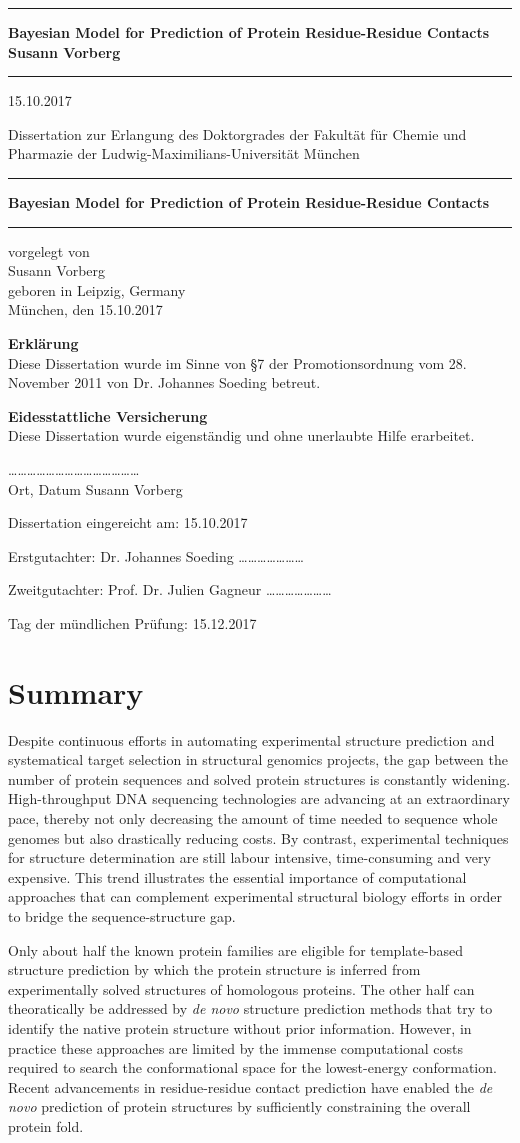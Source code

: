 \documentclass[11pt,a4paper,twoside]{book}
\newcommand{\LMUCover}[3]{
    \thispagestyle{empty}
    {\parindent0cm \rule{\linewidth}{.7ex}}
    
    \begin{flushright}
      \vspace*{\stretch{1}}
      \sffamily\bfseries\Huge
      #1\\
      \vspace*{\stretch{1}}
      \sffamily\bfseries\large
      #2
      \vspace*{\stretch{1}}
    \end{flushright}
  
    \rule{\linewidth}{.7ex}
    \vspace*{\stretch{5}}
    \vspace*{\stretch{1}}
    
    \begin{center}\sffamily\LARGE{#3}\end{center}
}
\newcommand{\LMUTitlePage}[4]{
    \thispagestyle{empty}
    \vspace*{\stretch{1}}
    
    \begin{center}
      \Large Dissertation zur Erlangung des Doktorgrades der Fakultät für Chemie und Pharmazie der Ludwig-Maximilians-Universität München
    \end{center}
    
    \vspace*{\stretch{1}}
    {\parindent0cm \rule{\linewidth}{.7ex}}
    
    \begin{flushright}
      \vspace*{\stretch{1}}
      \sffamily\bfseries\Huge
      #1\\
      \vspace*{\stretch{1}}
    \end{flushright}
  
    \rule{\linewidth}{.7ex}

    \vspace*{\stretch{3}}
    \begin{center}
      \Large vorgelegt von\\
      \Large #2\\
      \Large geboren in #3\\
      \vspace*{\stretch{2}}
      \Large München, den #4
    \end{center}
}
\newcommand{\LMUErklaerung}[5]{
    \thispagestyle{empty}
    \begin{flushleft}
      \large \textbf{Erklärung} \\[1mm]
      \large Diese Dissertation wurde im Sinne von §7 der Promotionsordnung vom 28. November 2011 von #2 betreut.
      \bigskip
  
      \large \textbf{Eidesstattliche Versicherung}\\[1mm]
      \large Diese Dissertation wurde eigenständig und ohne unerlaubte Hilfe erarbeitet.
      \vspace{5em}
  
      \dots\dots\dots   \dots\dots\dots \hfill \dots\dots\dots\dots\dots\dots\dots\dots\\
      \large Ort, Datum \hfill #1
      \vfill
  
  
      \large Dissertation eingereicht am: \hfill #4
      \bigskip
    
      \large Erstgutachter:  #2 \hfill \dots\dots\dots\dots\dots\dots\dots
      \bigskip
    
      \large Zweitgutachter: #3 \hfill \dots\dots\dots\dots\dots\dots\dots
      \bigskip
    
      \large Tag der mündlichen Prüfung: \hfill #5
    \end{flushleft}
}
\theoremstyle{definition}
\theoremstyle{definition}
\theoremstyle{remark}
\begin{document}
\frontmatter

\LMUCover
	{Bayesian Model for Prediction of Protein Residue-Residue Contacts}
	{Susann Vorberg}
	{15.10.2017}

\newpage
\thispagestyle{empty}
\cleardoublepage

\LMUTitlePage
	{Bayesian Model for Prediction of Protein Residue-Residue Contacts}
	{Susann Vorberg}
	{Leipzig, Germany}
	{15.10.2017}

\newpage
\thispagestyle{empty}
\cleardoublepage

\LMUErklaerung
	{Susann Vorberg}
	{Dr. Johannes Soeding}
	{Prof. Dr. Julien Gagneur}
	{15.10.2017}
	{15.12.2017}

\newpage
\thispagestyle{empty}
\cleardoublepage
\frontmatter\setcounter{page}{1}

\chapter*{Summary}\label{summary}

Despite continuous efforts in automating experimental structure
prediction and systematical target selection in structural genomics
projects, the gap between the number of protein sequences and solved
protein structures is constantly widening. High-throughput DNA
sequencing technologies are advancing at an extraordinary pace, thereby
not only decreasing the amount of time needed to sequence whole genomes
but also drastically reducing costs. By contrast, experimental
techniques for structure determination are still labour intensive,
time-consuming and very expensive. This trend illustrates the essential
importance of computational approaches that can complement experimental
structural biology efforts in order to bridge the sequence-structure
gap.

Only about half the known protein families are eligible for
template-based structure prediction by which the protein structure is
inferred from experimentally solved structures of homologous proteins.
The other half can theoratically be addressed by \emph{de novo}
structure prediction methods that try to identify the native protein
structure without prior information. However, in practice these
approaches are limited by the immense computational costs required to
search the conformational space for the lowest-energy conformation.
Recent advancements in residue-residue contact prediction have enabled
the \emph{de novo} prediction of protein structures by sufficiently
constraining the overall protein fold.
\end{document}
